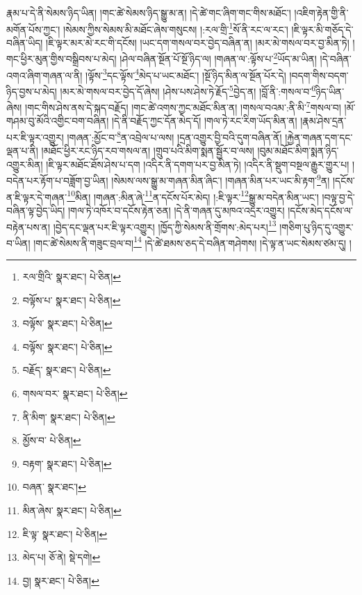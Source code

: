 རྣམ་པ་དེ་ནི་སེམས་ཉིད་ཡིན། །གང་ཚེ་སེམས་ཉིད་སྒྱུ་མ་ན། །དེ་ཚེ་གང་ཞིག་གང་གིས་མཐོང་། །འཇིག་རྟེན་གྱི་ནི་མགོན་པོས་ཀྱང་། །སེམས་ཀྱིས་སེམས་མི་མཐོང་ཞེས་གསུངས། །:རལ་གྲི་\footnote{རལ་གྲིའི་  སྣར་ཐང་།  པེ་ཅིན། }སོ་ནི་རང་ལ་རང་། །ཇི་ལྟར་མི་གཅོད་དེ་བཞིན་ཡིད། །ཇི་ལྟར་མར་མེ་རང་གི་དངོས། །ཡང་དག་གསལ་བར་བྱེད་བཞིན་ན། །མར་མེ་གསལ་བར་བྱ་མིན་ཏེ། །གང་ཕྱིར་མུན་གྱིས་བསྒྲིབས་པ་མེད། །ཤེལ་བཞིན་སྔོན་པོ་སྔོ་ཉིད་ལ། །གཞན་ལ་:ལྟོས་པ་\footnote{བལྟོས་པ་  སྣར་ཐང་།  པེ་ཅིན། }ཡོད་མ་ཡིན། །དེ་བཞིན་འགའ་ཞིག་གཞན་ལ་ནི། །ལྟོས་\footnote{བལྟོས་  སྣར་ཐང་།  པེ་ཅིན། }དང་ལྟོས་\footnote{བལྟོས་  སྣར་ཐང་།  པེ་ཅིན། }མེད་པ་ཡང་མཐོང་། །སྔོ་ཉིད་མིན་ལ་སྔོན་པོར་དེ། །བདག་གིས་བདག་ཉིད་བྱས་པ་མེད། །མར་མེ་གསལ་བར་བྱེད་དོ་ཞེས། །ཤེས་པས་ཤེས་ཏེ་རྗོད་\footnote{བརྗོད་  སྣར་ཐང་།  པེ་ཅིན། }བྱེད་ན། །བློ་ནི་:གསལ་བ་\footnote{གསལ་བར་  སྣར་ཐང་།  པེ་ཅིན། }ཉིད་ཡིན་ཞེས། །གང་གིས་ཤེས་ནས་དེ་སྐད་བརྗོད། །གང་ཚེ་འགས་ཀྱང་མཐོང་མིན་ན། །གསལ་བའམ་:ནི་མི་\footnote{ནི་མིག་  སྣར་ཐང་།  པེ་ཅིན། }གསལ་བ། །མོ་གཤམ་བུ་མོའི་འགྱིང་བག་བཞིན། །དེ་ནི་བརྗོད་ཀྱང་དོན་མེད་དོ། །གལ་ཏེ་རང་རིག་ཡོད་མིན་ན། །རྣམ་ཤེས་དྲན་པར་ཇི་ལྟར་འགྱུར། །གཞན་:མྱོང་བ་\footnote{མྱོས་བ་  པེ་ཅིན། }ན་འབྲེལ་པ་ལས། །དྲན་འགྱུར་བྱི་བའི་དུག་བཞིན་ནོ། །རྐྱེན་གཞན་དག་དང་ལྡན་པ་ནི། །མཐོང་ཕྱིར་རང་ཉིད་རབ་གསལ་ན། །གྲུབ་པའི་མིག་སྨན་སྦྱོར་བ་ལས། །བུམ་མཐོང་མིག་སྨན་ཉིད་འགྱུར་མིན། །ཇི་ལྟར་མཐོང་ཐོས་ཤེས་པ་དག །འདིར་ནི་དགག་པར་བྱ་མིན་ཏེ། །འདིར་ནི་སྡུག་བསྔལ་རྒྱུར་གྱུར་པ། །བདེན་པར་རྟོག་པ་བཟློག་བྱ་ཡིན། །སེམས་ལས་སྒྱུ་མ་གཞན་མིན་ཞིང་། །གཞན་མིན་པར་ཡང་མི་རྟག་\footnote{བརྟག་  སྣར་ཐང་།  པེ་ཅིན། }ན། །དངོས་ན་ཇི་ལྟར་དེ་གཞན་\footnote{བཞན་  སྣར་ཐང་། }མིན། །གཞན་:མིན་ཞེ་\footnote{མིན་ཞེས་  སྣར་ཐང་།  པེ་ཅིན། }ན་དངོས་པོར་མེད། །:ཇི་ལྟར་\footnote{ཇི་ལྟ་  སྣར་ཐང་།  པེ་ཅིན། }སྒྱུ་མ་བདེན་མིན་ཡང་། །བལྟ་བྱ་དེ་བཞིན་ལྟ་བྱེད་ཡིད། །གལ་ཏེ་འཁོར་བ་དངོས་རྟེན་ཅན། །དེ་ནི་གཞན་དུ་མཁའ་འདྲར་འགྱུར། །དངོས་མེད་དངོས་ལ་བརྟེན་པས་ན། །བྱེད་དང་ལྡན་པར་ཇི་ལྟར་འགྱུར། །ཁྱོད་ཀྱི་སེམས་ནི་གྲོགས་:མེད་པར།\footnote{མེད་པ།  ཅོ་ནེ།  སྡེ་དགེ། } །གཅིག་པུ་ཉིད་དུ་འགྱུར་བ་ཡིན། །གང་ཚེ་སེམས་ནི་གཟུང་བྲལ་བ།\footnote{བྱ།  སྣར་ཐང་།  པེ་ཅིན། } །དེ་ཚེ་ཐམས་ཅད་དེ་བཞིན་གཤེགས། །དེ་ལྟ་ན་ཡང་སེམས་ཙམ་དུ། །

